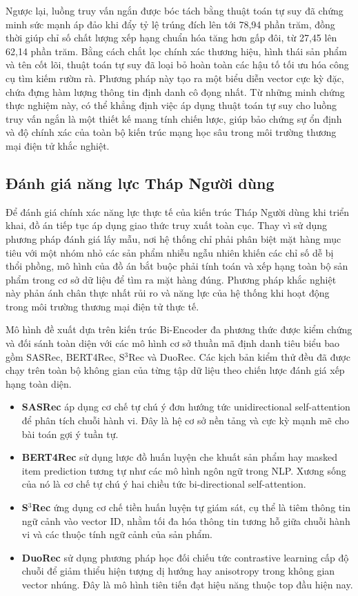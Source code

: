Ngược lại, luồng truy vấn ngắn được bóc tách bằng thuật toán tự suy đã chứng minh sức mạnh áp đảo khi đẩy tỷ lệ trúng đích lên tới 78,94 phần trăm, đồng thời giúp chỉ số chất lượng xếp hạng chuẩn hóa tăng hơn gấp đôi, từ 27,45 lên 62,14 phần trăm. Bằng cách chắt lọc chính xác thương hiệu, hình thái sản phẩm và tên cốt lõi, thuật toán tự suy đã loại bỏ hoàn toàn các hậu tố tối ưu hóa công cụ tìm kiếm rườm rà. Phương pháp này tạo ra một biểu diễn vector cực kỳ đặc, chứa đựng hàm lượng thông tin định danh cô đọng nhất. Từ những minh chứng thực nghiệm này, có thể khẳng định việc áp dụng thuật toán tự suy cho luồng truy vấn ngắn là một thiết kế mang tính chiến lược, giúp bảo chứng sự ổn định và độ chính xác của toàn bộ kiến trúc mạng học sâu trong môi trường thương mại điện tử khắc nghiệt.

\subsection{Đánh giá năng lực Tháp Người dùng}

Để đánh giá chính xác năng lực thực tế của kiến trúc Tháp Người dùng khi triển khai, đồ án tiếp tục áp dụng giao thức truy xuất toàn cục. Thay vì sử dụng phương pháp đánh giá lấy mẫu, nơi hệ thống chỉ phải phân biệt mặt hàng mục tiêu với một nhóm nhỏ các sản phẩm nhiễu ngẫu nhiên khiến các chỉ số dễ bị thổi phồng, mô hình của đồ án bắt buộc phải tính toán và xếp hạng toàn bộ sản phẩm trong cơ sở dữ liệu để tìm ra mặt hàng đúng. Phương pháp khắc nghiệt này phản ánh chân thực nhất rủi ro và năng lực của hệ thống khi hoạt động trong môi trường thương mại điện tử thực tế.

Mô hình đề xuất dựa trên kiến trúc Bi-Encoder đa phương thức được kiểm chứng và đối sánh toàn diện với các mô hình cơ sở thuần mã định danh tiêu biểu bao gồm SASRec, BERT4Rec, S$^3$Rec và DuoRec. Các kịch bản kiểm thử đều đã được chạy trên toàn bộ không gian của từng tập dữ liệu theo chiến lược đánh giá xếp hạng toàn diện.

\begin{itemize}
    \item \textbf{SASRec} \cite{7} áp dụng cơ chế tự chú ý đơn hướng tức unidirectional self-attention để phân tích chuỗi hành vi. Đây là hệ cơ sở nền tảng và cực kỳ mạnh mẽ cho bài toán gợi ý tuần tự.
    \item \textbf{BERT4Rec} \cite{54} sử dụng lược đồ huấn luyện che khuất sản phẩm hay masked item prediction tương tự như các mô hình ngôn ngữ trong NLP. Xương sống của nó là cơ chế tự chú ý hai chiều tức bi-directional self-attention.
    \item \textbf{S$^3$Rec} \cite{53} ứng dụng cơ chế tiền huấn luyện tự giám sát, cụ thể là tiêm thông tin ngữ cảnh vào vector ID, nhằm tối đa hóa thông tin tương hỗ giữa chuỗi hành vi và các thuộc tính ngữ cảnh của sản phẩm.
    \item \textbf{DuoRec} \cite{52} sử dụng phương pháp học đối chiếu tức contrastive learning cấp độ chuỗi để giảm thiểu hiện tượng dị hướng hay anisotropy trong không gian vector nhúng. Đây là mô hình tiên tiến đạt hiệu năng thuộc top đầu hiện nay.
\end{itemize}


